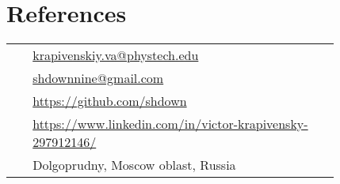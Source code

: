 \documentclass[10pt]{article}
\begin{document}
\medskip

\section{References}

\parbox[top][0.12\textheight][c]{\linewidth}{
    \vspace{-0.04\textheight}
    \colorbox{shade}{
        \begin{supertabular}{p{0.05\linewidth}|p{0.775\linewidth}}
            \raisebox{0pt}{\small  \faEnvelope}        & \href{mailto:krapivenskiy.va@phystech.edu}{krapivenskiy.va@phystech.edu} \\
            \raisebox{0pt}{\small  \faEnvelope}        & \href{mailto:shdownnine@gmail.com}{shdownnine@gmail.com} \\
            \raisebox{-1pt}{\small \faGithubAlt}       & \href{https://github.com/shdown}{https://github.com/shdown} \\
            \raisebox{-1pt}{\small \faLinkedinSquare}  & \href{https://www.linkedin.com/in/victor-krapivensky-297912146/}{https://www.linkedin.com/in/victor-krapivensky-297912146/} \\
            \raisebox{-1pt}{\small \faMapSigns}        & Dolgoprudny, Moscow oblast, Russia \\
        \end{supertabular}
    }
}
\end{document}
